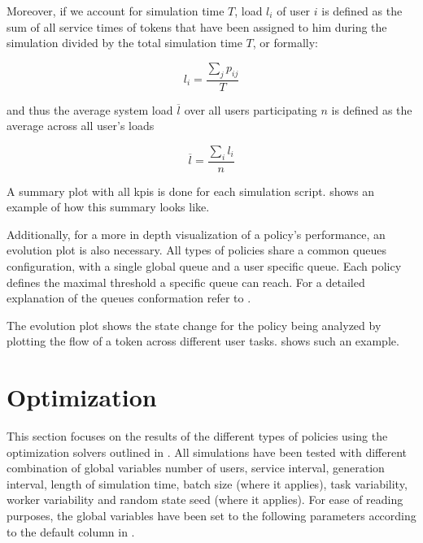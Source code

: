 \documentclass{seal_thesis}
\begin{document}
Moreover, if we account for simulation time $T$, load $l_i$ of user $i$ is defined as the sum of all service times of tokens that have been assigned to him during the simulation divided by the total simulation time $T$, or formally:

\begin{equation}
	l_i=\frac{\sum_j p_{ij}}{T}
\end{equation}

and thus the average system load $\overline{l}$ over all users participating $n$ is defined as the average across all user's loads \ie

\begin{equation}
	\overline{l} = \frac{\sum_i l_i}{n}
\end{equation}

A summary plot with all \glspl{kpi} is done for each simulation script.  shows an example of how this summary looks like.


Additionally, for a more in depth visualization of a policy's performance, an evolution plot is also necessary. All types of policies share a common queues configuration, with a single global queue and a user specific queue. Each policy defines the maximal threshold a specific queue can reach. For a detailed explanation of the queues conformation refer to .

The evolution plot shows the state change for the policy being analyzed by plotting the flow of a token across different user tasks.  shows such an example.


\clearpage

\section{Optimization}
\label{sec:op_results}

This section focuses on the results of the different types of policies using the optimization solvers outlined in . All simulations have been tested with different combination of global variables \ie number of users, service interval, generation interval, length of simulation time, batch size (where it applies), task variability, worker variability and random state seed (where it applies). For ease of reading purposes, the global variables have been set to the following parameters according to the default column in .
\end{document}
